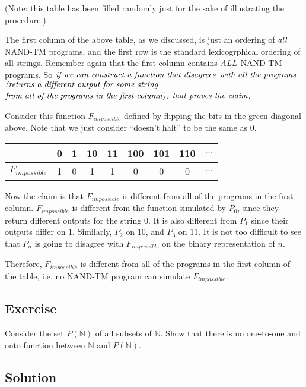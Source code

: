\documentclass[11pt]{article}
\theoremstyle{definition}
\theoremstyle{remark}
\begin{document}
(Note: this table has been filled randomly just for the sake of illustrating the procedure.)

The first column of the above table, as we discussed, is just an ordering of $\emph{all}$ NAND-TM programs, and
the first row is the standard lexicogrphical ordering of all strings. Remember again that the first column contains
$\emph{ALL}$ NAND-TM programs. So $\emph{if we can construct a function that disagrees}$
$\emph{with all the programs}$ $\emph{(returns a different output for some
string}$
$\emph{from all of the programs in the
first column)}$, $\emph{that proves the claim}$.

Consider this function $F_{impossible}$ defined by flipping the bits in the green diagonal above.
Note that we just consider ``doesn't halt'' to be the same as 0.

\begin{center}
    \begin{tabular}{c|cccccccc}
        & 0 & 1 & 10 & 11 & 100 & 101 & 110 & $\dots$ \\ 
        \hline
        $F_{impossible}$ & \cellcolor{green!20}1 & \cellcolor{green!20}0 & \cellcolor{green!20}1 & \cellcolor{green!20}1
        &\cellcolor{green!20}0 & \cellcolor{green!20}0 & \cellcolor{green!20}0 & $\dots$
    \end{tabular}
\end{center}

Now the claim is that $F_{impossible}$ is different from all of the programs in the first column. $F_{impossible}$ is different from
the function simulated by
$P_0$, since they return different outputs for the string $0$. It is also different from $P_1$ since their outputs differ on $1$. 
Similarly, $P_2$ on $10$, and $P_3$ on $11$. It is not too difficult to see that $P_n$ is going to disagree with $F_{impossible}$ on the
binary representation of $n$.

Therefore, $F_{impossible}$ is different from all of the programs in the first column of the table, i.e.
no NAND-TM program can simulate $F_{impossible}$.

\subsection{Exercise}
Consider the set $P(\mathbb{N})$ of all subsets of $\mathbb{N}$. Show that there is no one-to-one and onto function between 
$\mathbb{N}$ and $P(\mathbb{N})$. 

\subsection{Solution}
\end{document}
